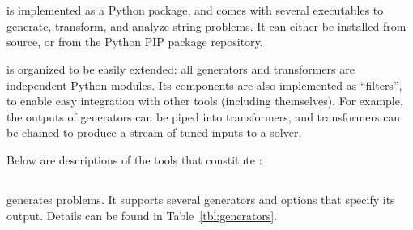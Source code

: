 \section{\fuzzer{}}
\label{sec:fuzzer}
\vspace{-0.1in}

    \fuzzer{} is implemented as a Python package, and comes with several executables to generate, transform, and analyze \smtfull{} string problems. It can either be installed from source, or from the Python PIP package repository. 
    

    \fuzzer{} is organized to be easily extended: all generators and transformers are independent Python modules. Its components are also implemented as \unix{} ``filters'', to enable easy integration with other tools (including themselves). For example, the outputs of generators can be piped into transformers, and transformers can be chained to produce a stream of tuned inputs to a solver. 
    
    Below are descriptions of the tools that constitute \fuzzer{}:


\vspace{-0.15in}
\subsection{\generator{}}

\generator{} generates \smt{} problems. It supports several generators and options that specify its output. Details can be found in Table~\ref{tbl:generators}.
    
    
    
